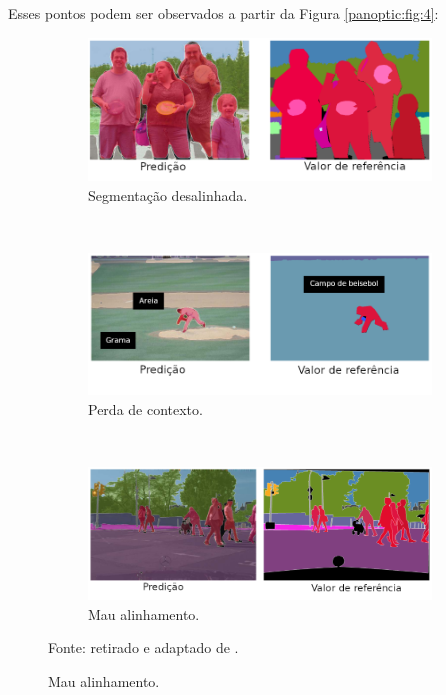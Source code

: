 Esses pontos podem ser observados a partir da Figura \ref{panoptic:fig:4}:

\begin{figure}[H]
   \caption{Falhas de segmentações panópticas.}
   \centering
   \label{panoptic:fig:4}
    \begin{subfigure}[t]{0.7\textwidth}
        \centering
        \includegraphics[width=1\linewidth]{recursos/imagens/panoptic/mau_adaptadas.png}
        \caption{Segmentação desalinhada.}
        \label{panoptic:fig:4.1}
    \end{subfigure}%
    ~ 

    \begin{subfigure}[t]{0.7\textwidth}
        \centering
        \includegraphics[width=1\linewidth]{recursos/imagens/panoptic/perda_contexto.png}
        \caption{Perda de contexto.}
        \label{panoptic:fig:4.2}
    \end{subfigure}%
    ~ 
    
    \begin{subfigure}[t]{0.7\textwidth}
        \centering
        \includegraphics[width=1\linewidth]{recursos/imagens/panoptic/mau_alinhamento.png}
        \caption{Mau alinhamento.}
        \label{panoptic:fig:4.3}
    \end{subfigure}

    Fonte: retirado e adaptado de \cite{Christoph2019}.
\end{figure}

